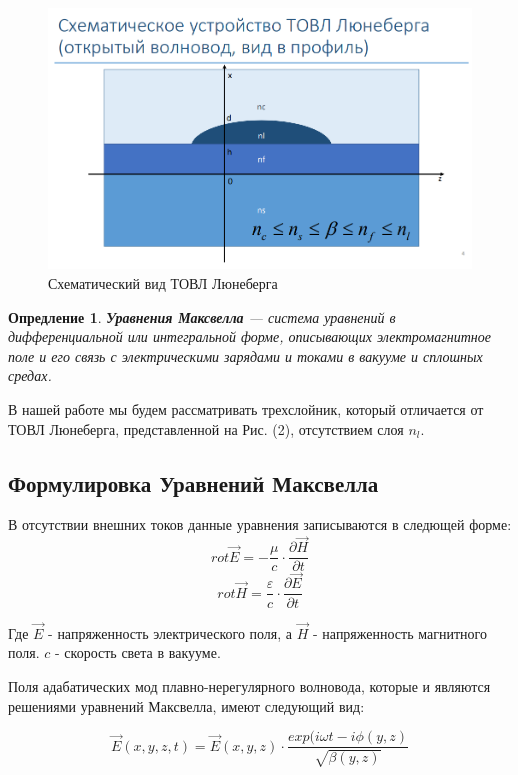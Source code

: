 \documentclass{article}
\newtheorem{definition}{Опредление}
\begin{document}
\begin{figure}[H]
    \centering
    \includegraphics[width=\linewidth]{image2.png}
    \caption{Схематический вид ТОВЛ Люнеберга}
    \label{luneberg}
\end{figure}

\begin{definition}
{\bf Уравнения Максвелла} — система уравнений в дифференциальной или интегральной форме, описывающих электромагнитное поле и его связь с электрическими зарядами и токами в вакууме и сплошных средах.
\end{definition}

В нашей работе мы будем рассматривать трехслойник, который отличается от ТОВЛ Люнеберга, представленной на Рис. (2), отсутствием слоя $n_l$.

\subsection{Формулировка Уравнений Максвелла}
В отсутствии внешних токов данные уравнения записываются в следющей форме\cite{luneberg2010}:
$$rot \vec{E} = - \frac{\mu}{c} \cdot \frac{\partial \vec{H}}{\partial t}$$
$$rot \vec{H} = \frac{\varepsilon}{c}\cdot\frac{\partial \vec{E}}{\partial t}$$

Где $\vec{E}$ - напряженность электрического поля, а $\vec{H}$ - напряженность магнитного поля. $c$ - скорость света в вакууме.

\par Поля адабатических мод плавно-нерегулярного волновода, которые и являются решениями уравнений Максвелла, имеют следующий вид:

$$\vec{E}(x, y, z, t) = \vec{E}(x, y, z) \cdot \frac{exp(i \omega t - i \phi(y, z)}{\sqrt{\beta(y, z)}}$$
\end{document}
